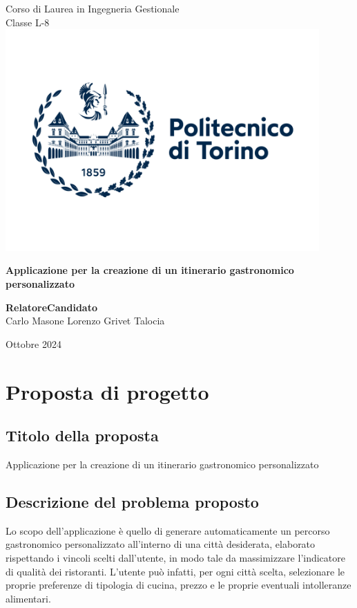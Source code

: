 \documentclass{report}
\begin{document}
\thispagestyle{empty}
\begin{center}
    \Large Corso di Laurea in Ingegneria Gestionale\\
\Large Classe L-8\\[2cm]

\includegraphics[width=12cm]{images/Logo_PoliTo_scritta.png}

\vspace*{2cm}

{\Huge \bfseries Applicazione per la creazione di un itinerario gastronomico personalizzato}

\vfill

{\Large \bfseries Relatore\hfill Candidato}\\
{\Large Carlo Masone \hfill Lorenzo Grivet Talocia}

\vspace*{1cm}
{\Large Ottobre 2024}

\end{center}


\tableofcontents

\hypersetup{
linkcolor=lnkcolor
}

\chapter{Proposta di progetto}\label{cap_proposta}

\section{Titolo della proposta}\label{sec_titolo}
Applicazione per la creazione di un itinerario gastronomico personalizzato

\section{Descrizione del problema proposto}\label{sec_descrizione}
Lo scopo dell'applicazione è quello di generare automaticamente un percorso gastronomico personalizzato all'interno di una città desiderata, elaborato rispettando i vincoli scelti dall'utente, in modo tale da massimizzare l'indicatore di qualità dei ristoranti. L'utente può infatti, per ogni città scelta, selezionare le proprie preferenze di tipologia di cucina, prezzo e le proprie eventuali intolleranze alimentari. 
\end{document}
